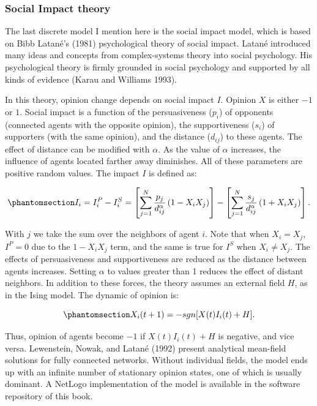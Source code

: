 \documentclass[
  a4paper,
  DIV=11,
  numbers=noendperiod,
  oneside]{scrreprt}
\begin{document}
\subsubsection{Social Impact theory}\label{sec-Social-Impact-theory}

The last discrete model I mention here is the social impact model, which
is based on Bibb Latané's (1981) psychological theory of social impact.
Latané introduced many ideas and concepts from complex-systems theory
into social psychology. His psychological theory is firmly grounded in
social psychology and supported by all kinds of evidence (Karau and
Williams 1993).

In this theory, opinion change depends on social impact \(I\). Opinion
\(X\) is either \(-1\) or \(1\). Social impact is a function of the
persuasiveness (\(p_{i}\)) of opponents (connected agents with the
opposite opinion), the supportiveness (\(s_{i}\)) of supporters (with
the same opinion), and the distance (\(d_{ij}\)) to these agents. The
effect of distance can be modified with \(\alpha\). As the value of
\(\alpha\) increases, the influence of agents located farther away
diminishes. All of these parameters are positive random values. The
impact \(I\) is defined as:

\begin{equation}\phantomsection\label{eq-ch7-SI-a}{I_{i} = I_{i}^{P} - I_{i}^{S} = \left\lbrack \sum_{j = 1}^{N}{\frac{p_{j}}{d_{ij}^{\alpha}}\left( 1 - X_{i}X_{j} \right)} \right\rbrack - \left\lbrack \sum_{j = 1}^{N}{\frac{s_{j}}{d_{ij}^{\alpha}}\left( 1 + X_{i}X_{j} \right)} \right\rbrack.}\end{equation}

With \(j\) we take the sum over the neighbors of agent \(i\). Note that
when \(X_{i} = X_{j}\), \(I^{P} = 0\) due to the \(1 - X_{i}X_{j}\)
term, and the same is true for \(I^{S}\) when \(X_{i} \neq X_{j}\). The
effects of persuasiveness and supportiveness are reduced as the distance
between agents increases. Setting \(\alpha\) to values greater than 1
reduces the effect of distant neighbors. In addition to these forces,
the theory assumes an external field \(H\), as in the Ising model. The
dynamic of opinion is:

\begin{equation}\phantomsection\label{eq-ch7-SI-b}{X_{i}(t + 1) = - sgn\lbrack X(t)I_{i}(t) + H\rbrack.}\end{equation}

Thus, opinion of agents become \(-1\) if \(X(t)I_{i}(t) + H\) is
negative, and vice versa. Lewenstein, Nowak, and Latané (1992) present
analytical mean-field solutions for fully connected networks. Without
individual fields, the model ends up with an infinite number of
stationary opinion states, one of which is usually dominant. A NetLogo
implementation of the model is available in the software repository of
this book.
\end{document}
